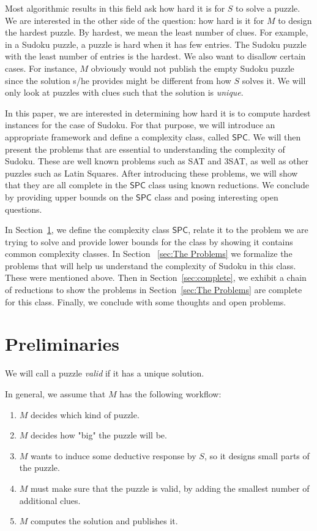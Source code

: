\documentclass[runningheads,a4paper]{llncs}
\begin{document}
Most algorithmic results in this field ask how hard it is for $S$ to solve a puzzle. We are interested in the other side of the question: how hard is it for $M$ to design the hardest puzzle. By hardest, we mean the least number of clues. For example, in a Sudoku puzzle, a puzzle is hard when it has few entries. The Sudoku puzzle with the least number of entries is the hardest. We also want to disallow certain cases. For instance, $M$ obviously would not publish the empty Sudoku puzzle since the solution s/he provides might be different from how $S$ solves it. We will only look at puzzles with clues such that the solution is \emph{unique}.

In this paper, we are interested in determining how hard it is to compute hardest instances for the case of Sudoku. For that purpose, we will introduce an appropriate framework and define a complexity class, called $\mathsf{SPC}$. We will then present the problems that are essential to understanding the complexity of Sudoku. These are well known problems such as SAT and 3SAT, as well as other puzzles such as Latin Squares. After introducing these problems, we will show that they are all complete in the $\mathsf{SPC}$ class using known reductions. We conclude by providing upper bounds on the $\mathsf{SPC}$ class and posing interesting open questions. 

In Section~\ref{sec:prelim}, we define the complexity class $\mathsf{SPC}$, relate it to the problem we are trying to solve and provide lower bounds for the class by showing it contains common complexity classes. In Section ~\ref{sec:The Problems} we formalize the problems that will help us understand the complexity of Sudoku in this class. These were mentioned above. Then in Section~\ref{sec:complete}, we exhibit a chain of reductions to show the problems in Section~\ref{sec:The Problems} are complete for this class. Finally, we conclude with some thoughts and open problems.

\section{Preliminaries}
\label{sec:prelim}

\begin{definition}
We will call a puzzle \emph{valid} if it has a unique solution.
\end{definition}

In general, we assume that $M$ has the following workflow:
\begin{enumerate}
\item $M$ decides which kind of puzzle.
\item $M$ decides how "big" the puzzle will be.
\item $M$ wants to induce some deductive response by $S$, so it designs small parts of the puzzle.
\item $M$ must make sure that the puzzle is valid, by adding the smallest number of additional clues.
\item $M$ computes the solution and publishes it. 
\end{enumerate}
\end{document}
